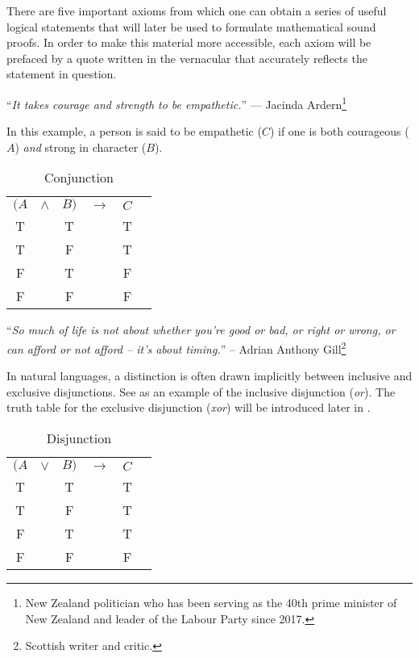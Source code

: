 There are five important axioms from which one can obtain a series of useful logical
statements that will later be used to formulate mathematical sound proofs. In order
to make this material more accessible, each axiom will be prefaced by a quote written
in the vernacular that accurately reflects the statement in question.

\begin{displayquote}
	``\emph{It takes courage and strength to be empathetic.}''
	--- Jacinda Ardern\footnote{New Zealand politician who has been serving as the
		40th prime minister of New Zealand and leader of the Labour Party since 2017.}
\end{displayquote}

In this example, a person is said to be empathetic (\(C\)) if one is both
courageous (\(A\)) \emph{and} strong in character (\(B\)).

\begin{table}[hbt!]
	\centering
	\begin{tabular}{*{6}{c}}
		$(A$ & $\land$ & $B)$ & $\rightarrow$ & $C$ \\
		T    &         & T    &               & T   \\
		T    &         & F    &               & T   \\
		F    &         & T    &               & F   \\
		F    &         & F    &               & F   \\
	\end{tabular}
	\caption{Conjunction}\label{table-conjunction}
\end{table}

\begin{displayquote}
	``\emph{So much of life is not about whether you're good or bad, or right or
		wrong, or can afford or not afford -- it's about timing.}''
	-- Adrian Anthony Gill\footnote{Scottish writer and critic.}
\end{displayquote}

In natural languages, a distinction is often drawn implicitly between inclusive
and exclusive disjunctions. See  as an example of
the inclusive disjunction (\emph{or}). The truth table for the exclusive disjunction
(\emph{xor}) will be introduced later in .

\begin{table}[hbt!]
	\centering
	\begin{tabular}{*{6}{c}}
		$(A$ & $\lor$ & $B)$ & $\rightarrow$ & $C$ \\
		T    &        & T    &               & T   \\
		T    &        & F    &               & T   \\
		F    &        & T    &               & T   \\
		F    &        & F    &               & F   \\
	\end{tabular}
	\caption{Disjunction}\label{table-disjunction}
\end{table}

